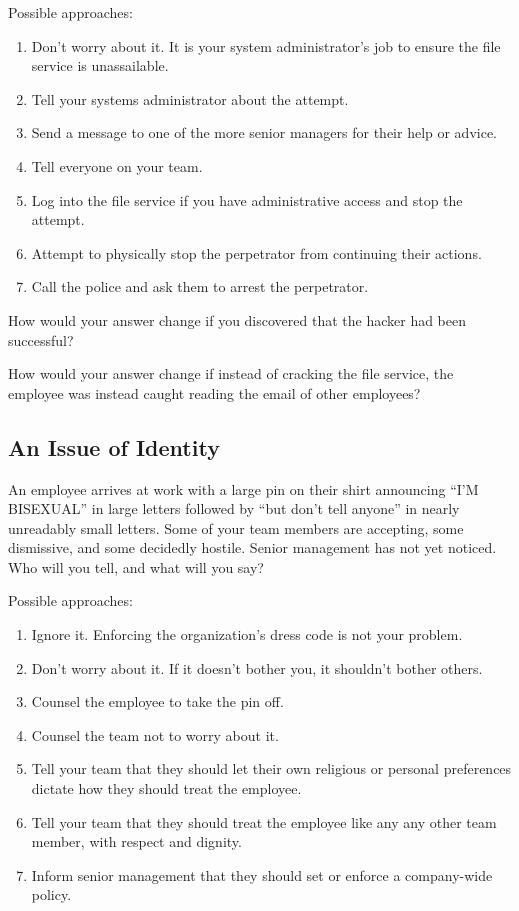 Possible approaches:

\begin{enumerate}
\item Don't worry about it. It is your system administrator's job to ensure the file service is unassailable.
\item Tell your systems administrator about the attempt.
\item Send a message to one of the more senior managers for their help or advice.
\item Tell everyone on your team.
\item Log into the file service if you have administrative access and stop the attempt.
\item Attempt to physically stop the perpetrator from continuing their actions.
\item Call the police and ask them to arrest the perpetrator.
\end{enumerate}

How would your answer change if you discovered that the hacker had been successful?

How would your answer change if instead of cracking the file service, the employee was instead caught reading the email of other employees?


\subsection{An Issue of Identity}

An employee arrives at work with a large pin on their shirt announcing ``I'M BISEXUAL'' in large letters followed by ``but don't tell anyone'' in nearly unreadably small letters. Some of your team members are accepting, some dismissive, and some decidedly hostile. Senior management has not yet noticed. Who will you tell, and what will you say?

Possible approaches:

\begin{enumerate}
\item Ignore it. Enforcing the organization's dress code is not your problem.
\item Don't worry about it. If it doesn't bother you, it shouldn't bother others.
\item Counsel the employee to take the pin off.
\item Counsel the team not to worry about it.
\item Tell your team that they should let their own religious or personal preferences dictate how they should treat the employee.
\item Tell your team that they should treat the employee like any any other team member, with respect and dignity.
\item Inform senior management that they should set or enforce a company-wide policy.
\end{enumerate}

